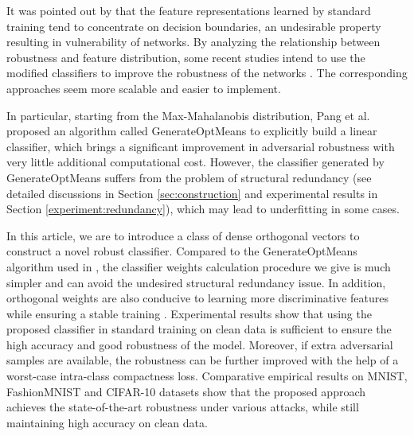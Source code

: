 \documentclass[preprint,review,12pt]{elsarticle}
\numberwithin{equation}{section}
\begin{document}
    It was pointed out by \cite{moosavi2016} that the feature representations learned by standard training tend to concentrate on decision boundaries,
	an undesirable property resulting in vulnerability of networks.
    By analyzing the relationship between robustness and feature distribution,
    some recent studies intend to use the modified classifiers to improve the robustness of the networks \cite{mustafa2019,han2019,pang2018,pang2020}.
	The corresponding approaches seem more scalable and easier to implement.


	In particular, starting from the Max-Mahalanobis distribution,
    Pang et al. \cite{pang2018,pang2020} proposed an algorithm called GenerateOptMeans to explicitly build a linear classifier,
 	which brings a significant improvement in adversarial robustness with very little additional computational cost.
    However, the classifier generated by GenerateOptMeans suffers from the problem of structural redundancy
    (see detailed discussions in Section \ref{sec:construction} and experimental results in Section \ref{experiment:redundancy}),
    which may lead to underfitting in some cases.

	
	

    In this article, we are to introduce a class of dense orthogonal vectors to construct a novel robust classifier.
    Compared to the GenerateOptMeans algorithm used in \cite{pang2018, pang2020},
    the classifier weights calculation procedure we give is much simpler and can avoid the undesired structural redundancy issue.
    In addition, orthogonal weights are also conducive to learning more discriminative features while ensuring a stable training \cite{wang2019}.
    Experimental results show that using the proposed classifier in standard training on clean data is sufficient to ensure the high accuracy and good robustness of the model.
    Moreover, if extra adversarial samples are available,
    the robustness can be further improved with the help of a worst-case intra-class compactness loss.
    Comparative empirical results on MNIST, FashionMNIST and CIFAR-10 datasets
    show that the proposed approach achieves the state-of-the-art robustness under various attacks,
    while still maintaining high accuracy on clean data.
\end{document}
